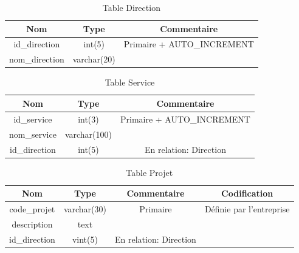 \documentclass{report}
\begin{document}
\begin{table}[h!]
    \begin{center}
        \begin{tabular}{|c|c|c|}
            \hline
            \textbf{Nom} & \textbf{Type} & \textbf{Commentaire}  \\
            \hline
            id\_direction & int(5) & Primaire + AUTO\_INCREMENT \\
            \hline
            nom\_direction & varchar(20) & \\
            \hline
        \end{tabular}
    \end{center}
\caption{Table Direction}
\end{table}

\begin{table}[h!]
    \begin{center}
        \begin{tabular}{|c|c|c|}
            \hline
            \textbf{Nom} & \textbf{Type} & \textbf{Commentaire}  \\
            \hline
            id\_service & int(3) & Primaire + AUTO\_INCREMENT \\
            \hline
            nom\_service & varchar(100) &  \\
            \hline
            id\_direction & int(5) & En relation: Direction \\
            \hline
        \end{tabular}
    \end{center}
\caption{Table Service}
\end{table}

\begin{table}[h!]
    \begin{center}
        \begin{tabular}{|c|c|c|c|}
            \hline
            \textbf{Nom} & \textbf{Type} & \textbf{Commentaire} & \textbf{Codification} \\
            \hline
            code\_projet & varchar(30) & Primaire & Définie par l'entreprise \\
            \hline
            description & text &  &\\
            \hline
            id\_direction & vint(5) & En relation: Direction &\\
            \hline
        \end{tabular}
    \end{center}
\caption{Table Projet}
\end{table}
\end{document}

